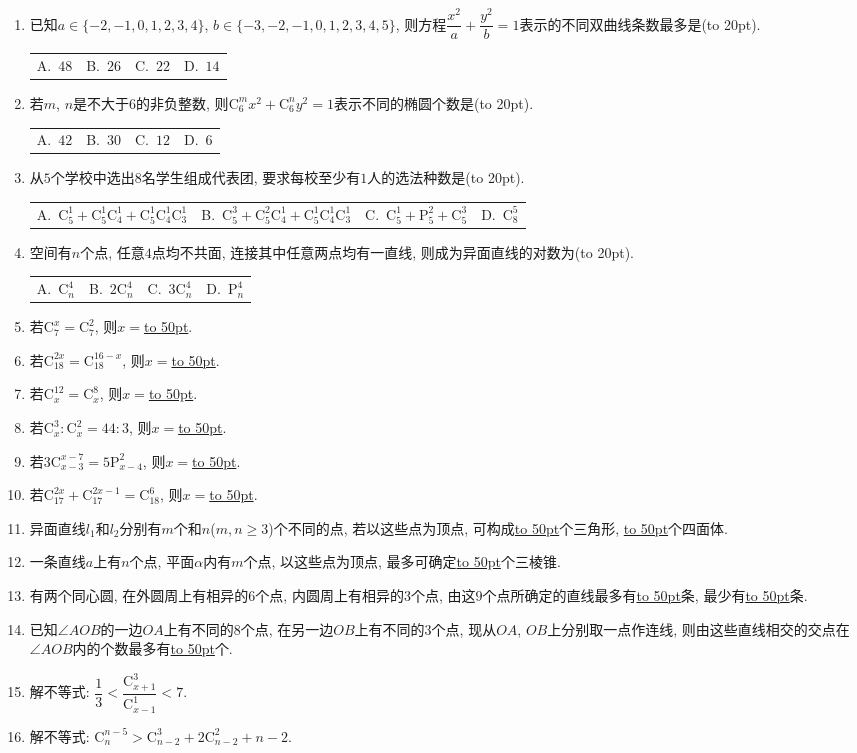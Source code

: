 \documentclass[10pt,a4paper]{article}
\newcommand{\blank}[1]{\underline{\hbox to #1pt{}}}
\newcommand{\bracket}[1]{(\hbox to #1pt{})}
\newcommand{\fourch}[4]{\par\begin{tabular}{p{.23\textwidth}p{.23\textwidth}p{.23\textwidth}p{.23\textwidth}}
A.~#1 &B.~#2& C.~#3& D.~#4
\end{tabular}}
\begin{document}
\begin{enumerate}[1.]
\fourch{$4$种}{$10$种}{$24$种}{$60$种}
\item 已知$a\in \{-2,-1,0,1,2,3,4\}$, $b\in \{-3,-2,-1,0,1,2,3,4,5\}$, 则方程$\dfrac{x^2}a+\dfrac{y^2}b=1$表示的不同双曲线条数最多是\bracket{20}.
\fourch{$48$}{$26$}{$22$}{$14$}
\item 若$m$, $n$是不大于$6$的非负整数, 则$\mathrm{C}_6^mx^2+\mathrm{C}_6^ny^2=1$表示不同的椭圆个数是\bracket{20}.
\fourch{$42$}{$30$}{$12$}{$6$}
\item 从$5$个学校中选出$8$名学生组成代表团, 要求每校至少有$1$人的选法种数是\bracket{20}.
\fourch{$\mathrm{C}_5^1+\mathrm{C}_5^1\mathrm{C}_4^1+\mathrm{C}_5^1\mathrm{C}_4^1\mathrm{C}_3^1$}{$\mathrm{C}_5^3+\mathrm{C}_5^2\mathrm{C}_4^1+\mathrm{C}_5^1\mathrm{C}_4^1\mathrm{C}_3^1$}{$\mathrm{C}_5^1+\mathrm{P}_5^2+\mathrm{C}_5^3$}{$\mathrm{C}_8^5$}
\item 空间有$n$个点, 任意$4$点均不共面, 连接其中任意两点均有一直线, 则成为异面直线的对数为\bracket{20}.
\fourch{$\mathrm{C}_n^4$}{$2\mathrm{C}_n^4$}{$3\mathrm{C}_n^4$}{$\mathrm{P}_n^4$}
\item 若$\mathrm{C}_7^x=\mathrm{C}_7^2$, 则$x=$\blank{50}.
\item 若$\mathrm{C}_{18}^{2x}=\mathrm{C}_{18}^{16-x}$, 则$x=$\blank{50}.
\item 若$\mathrm{C}_x^{12}=\mathrm{C}_x^8$, 则$x=$\blank{50}.
\item 若$\mathrm{C}_x^3:\mathrm{C}_x^2=44:3$, 则$x=$\blank{50}.
\item 若$3\mathrm{C}_{x-3}^{x-7}=5\mathrm{P}_{x-4}^2$, 则$x=$\blank{50}.
\item 若$\mathrm{C}_{17}^{2x}+\mathrm{C}_{17}^{2x-1}=\mathrm{C}_{18}^6$, 则$x=$\blank{50}.
\item 异面直线$l_1$和$l_2$分别有$m$个和$n$($m,n\ge 3$)个不同的点, 若以这些点为顶点, 可构成\blank{50}个三角形, \blank{50}个四面体.
\item 一条直线$a$上有$n$个点, 平面$\alpha$内有$m$个点, 以这些点为顶点, 最多可确定\blank{50}个三棱锥.
\item 有两个同心圆, 在外圆周上有相异的$6$个点, 内圆周上有相异的$3$个点, 由这$9$个点所确定的直线最多有\blank{50}条, 最少有\blank{50}条.
\item 已知$\angle AOB$的一边$OA$上有不同的$8$个点, 在另一边$OB$上有不同的$3$个点, 现从$OA$, $OB$上分别取一点作连线, 则由这些直线相交的交点在$\angle AOB$内的个数最多有\blank{50}个.
\item 解不等式: $\dfrac 13<\dfrac{\mathrm{C}_{x+1}^3}{\mathrm{C}_{x-1}^1}<7$.
\item 解不等式: $\mathrm{C}_n^{n-5}>\mathrm{C}_{n-2}^3+2\mathrm{C}_{n-2}^2+n-2$.

\end{enumerate}
\end{document}
